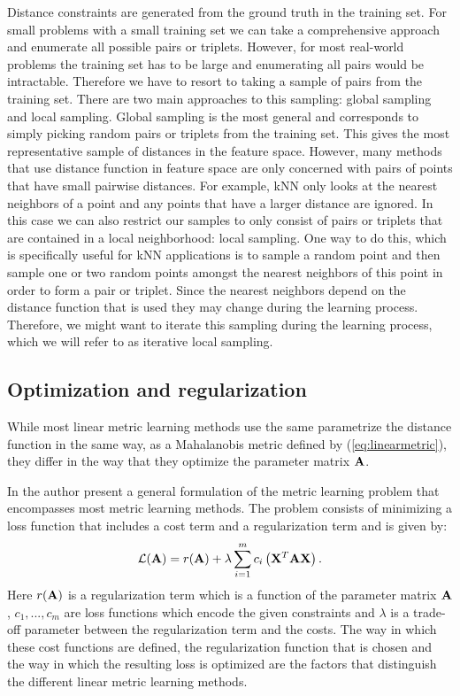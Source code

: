 Distance constraints are generated from the ground truth in the training set. For small problems with a small training set we can take a comprehensive approach and enumerate all possible pairs or triplets. However, for most real-world problems the training set has to be large and enumerating all pairs would be intractable. Therefore we have to resort to taking a sample of pairs from the training set. There are two main approaches to this sampling: global sampling and local sampling. Global sampling is the most general and corresponds to simply picking random pairs or triplets from the training set. This gives the most representative sample of distances in the feature space. However, many methods that use distance function in feature space are only concerned with pairs of points that have small pairwise distances. For example, \ac{kNN} only looks at the nearest neighbors of a point and any points that have a larger distance are ignored. In this case we can also restrict our samples to only consist of pairs or triplets that are contained in a local neighborhood: local sampling. One way to do this, which is specifically useful for \ac{kNN} applications is to sample a random point and then sample one or two random points amongst the nearest neighbors of this point in order to form a pair or triplet. Since the nearest neighbors depend on the distance function that is used they may change during the learning process. Therefore, we might want to iterate this sampling during the learning process, which we will refer to as iterative local sampling.



\subsection{Optimization and regularization}

While most linear metric learning methods use the same parametrize the distance function in the same way, as a Mahalanobis metric defined by (\ref{eq:linearmetric}), they differ in the way that they optimize the parameter matrix $\mathbf{A}$.

In \cite{kulis2012metric} the author present a general formulation of the metric learning problem that encompasses most metric learning methods. The problem consists of minimizing a loss function that includes a cost term and a regularization term and is given by:
\begin{equation}
\mathcal{L}(\mathbf{A}) = r(\mathbf{A}) + \lambda \sum_{i=1}^{m} c_i \left(\mathbf{X}^T\mathbf{A}\mathbf{X}\right).
\label{eq:metriclearningmodel}
\end{equation}
Here $r(\mathbf{A})$ is a regularization term which is a function of the parameter matrix $\mathbf{A}$, $c_1, ..., c_m$ are loss functions which encode the given constraints and $\lambda$ is a trade-off parameter between the regularization term and the costs. The way in which these cost functions are defined, the regularization function that is chosen and the way in which the resulting loss is optimized are the factors that distinguish the different linear metric learning methods.

